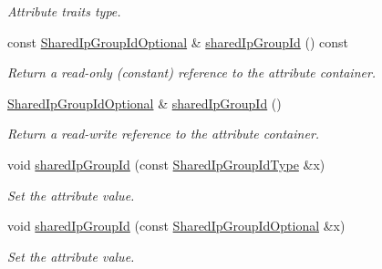 \begin{DoxyCompactItemize}
\begin{DoxyCompactList}\small\item\em Attribute traits type. \item\end{DoxyCompactList}\item 
const \hyperlink{classopenstack_1_1xml_1_1Server_a3c7e119808138b2e2bdaa2a63af0a982}{SharedIpGroupIdOptional} \& \hyperlink{classopenstack_1_1xml_1_1Server_a1eb044a3c60af0911dc11179fdfc9c1f}{sharedIpGroupId} () const 
\begin{DoxyCompactList}\small\item\em Return a read-\/only (constant) reference to the attribute container. \item\end{DoxyCompactList}\item 
\hyperlink{classopenstack_1_1xml_1_1Server_a3c7e119808138b2e2bdaa2a63af0a982}{SharedIpGroupIdOptional} \& \hyperlink{classopenstack_1_1xml_1_1Server_a96c31fc20ce069e218b004f2784aaed6}{sharedIpGroupId} ()
\begin{DoxyCompactList}\small\item\em Return a read-\/write reference to the attribute container. \item\end{DoxyCompactList}\item 
void \hyperlink{classopenstack_1_1xml_1_1Server_ab944a6239a0640c7ad2653219e8101ca}{sharedIpGroupId} (const \hyperlink{classopenstack_1_1xml_1_1Server_afaf21469710f4df6287cde3cce6f0693}{SharedIpGroupIdType} \&x)
\begin{DoxyCompactList}\small\item\em Set the attribute value. \item\end{DoxyCompactList}\item 
void \hyperlink{classopenstack_1_1xml_1_1Server_ad548434632fd04dc9ce0337f9aec468f}{sharedIpGroupId} (const \hyperlink{classopenstack_1_1xml_1_1Server_a3c7e119808138b2e2bdaa2a63af0a982}{SharedIpGroupIdOptional} \&x)
\begin{DoxyCompactList}\small\item\em Set the attribute value. \item\end{DoxyCompactList}\end{DoxyCompactItemize}

